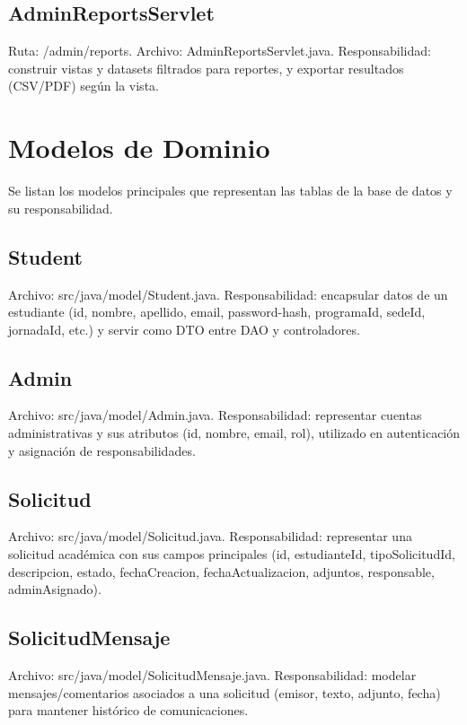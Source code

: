 \documentclass[12pt,letterpaper]{article}
\newcommand{\code}[1]{\texorpdfstring{\begingroup\normalfont\normalsize\def\_{\textunderscore\allowbreak}#1\endgroup}{#1}}
\begin{document}
\subsection*{AdminReportsServlet}
Ruta: \code{/admin/reports}. Archivo: \code{AdminReportsServlet.java}.
Responsabilidad: construir vistas y datasets filtrados para reportes, y exportar resultados (CSV/PDF) según la vista.

\section{Modelos de Dominio}

Se listan los modelos principales que representan las tablas de la base de datos y su responsabilidad.

\subsection*{Student}
Archivo: \code{src/java/model/Student.java}.
Responsabilidad: encapsular datos de un estudiante (id, nombre, apellido, email, password-hash, programaId, sedeId, jornadaId, etc.) y servir como DTO entre DAO y controladores.

\subsection*{Admin}
Archivo: \code{src/java/model/Admin.java}.
Responsabilidad: representar cuentas administrativas y sus atributos (id, nombre, email, rol), utilizado en autenticación y asignación de responsabilidades.

\subsection*{Solicitud}
Archivo: \code{src/java/model/Solicitud.java}.
Responsabilidad: representar una solicitud académica con sus campos principales (id, estudianteId, tipoSolicitudId, descripcion, estado, fechaCreacion, fechaActualizacion, adjuntos, responsable, adminAsignado).

\subsection*{SolicitudMensaje}
Archivo: \code{src/java/model/SolicitudMensaje.java}.
Responsabilidad: modelar mensajes/comentarios asociados a una solicitud (emisor, texto, adjunto, fecha) para mantener histórico de comunicaciones.
\end{document}
